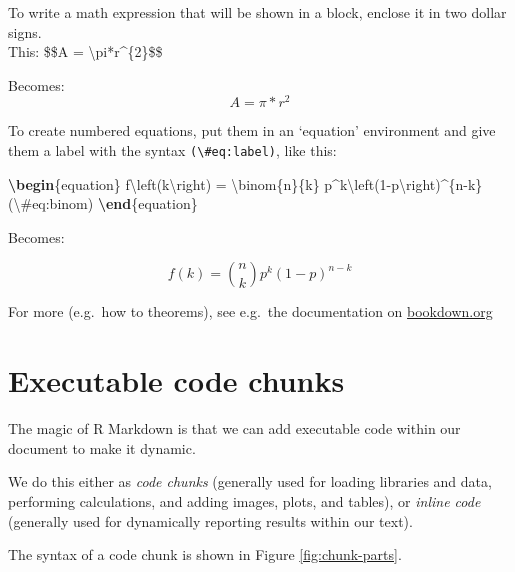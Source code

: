 \documentclass[a4paper,nobind]{templates/ociamthesis}
\newenvironment{Shaded}{\begin{snugshade}}{\end{snugshade}}
\newcommand{\ExtensionTok}[1]{#1}
\newcommand{\KeywordTok}[1]{\textcolor[rgb]{0.13,0.29,0.53}{\textbf{#1}}}
\newcommand{\NormalTok}[1]{#1}
\newcommand{\SpecialCharTok}[1]{\textcolor[rgb]{0.00,0.00,0.00}{#1}}
\newcommand{\SpecialStringTok}[1]{\textcolor[rgb]{0.31,0.60,0.02}{#1}}
\renewenvironment{Shaded}
{
  \vspace{10pt}%
  \begin{snugshade}%
}{%
  \end{snugshade}%
  \vspace{8pt}%
}
\begin{document}
To write a math expression that will be shown in a block, enclose it in
two dollar signs.\\
This: \$\$A = \textbackslash{}pi*r\^{}\{2\}\$\$

Becomes: \[A = \pi*r^{2}\]

To create numbered equations, put them in an `equation' environment and
give them a label with the syntax \texttt{(\textbackslash{}\#eq:label)},
like this:

\begin{Shaded}
\begin{Highlighting}[]
\KeywordTok{\textbackslash{}begin}\NormalTok{\{}\ExtensionTok{equation}\NormalTok{\}}\SpecialStringTok{ }
\SpecialStringTok{  f}\SpecialCharTok{\textbackslash{}left}\SpecialStringTok{(k}\SpecialCharTok{\textbackslash{}right}\SpecialStringTok{) = }\SpecialCharTok{\textbackslash{}binom}\SpecialStringTok{\{n\}\{k\} p^k}\SpecialCharTok{\textbackslash{}left}\SpecialStringTok{(1-p}\SpecialCharTok{\textbackslash{}right}\SpecialStringTok{)^\{n-k\}}
\SpecialStringTok{  (}\SpecialCharTok{\textbackslash{}#}\SpecialStringTok{eq:binom)}
\KeywordTok{\textbackslash{}end}\NormalTok{\{}\ExtensionTok{equation}\NormalTok{\} }
\end{Highlighting}
\end{Shaded}

Becomes:

\begin{equation}
f\left(k\right)=\binom{n}{k}p^k\left(1-p\right)^{n-k}
\label{eq:binom}
\end{equation}

For more (e.g.~how to theorems), see e.g.~the documentation on
\href{https://bookdown.org/yihui/bookdown/markdown-extensions-by-bookdown.html\#equations}{bookdown.org}

\section{Executable code chunks}\label{code}

The magic of R Markdown is that we can add executable code within our
document to make it dynamic.

We do this either as \emph{code chunks} (generally used for loading
libraries and data, performing calculations, and adding images, plots,
and tables), or \emph{inline code} (generally used for dynamically
reporting results within our text).

The syntax of a code chunk is shown in Figure \ref{fig:chunk-parts}.
\end{document}
